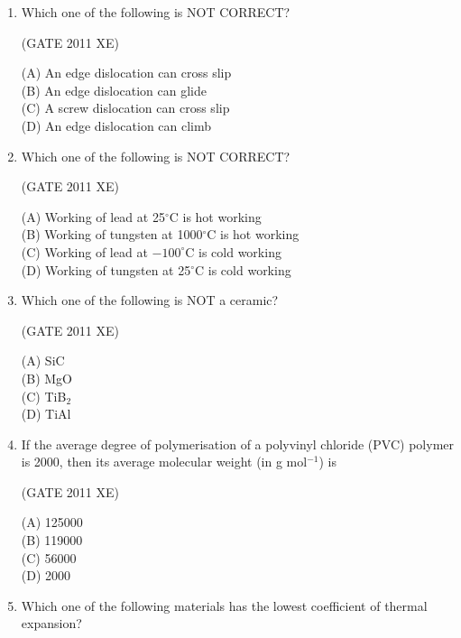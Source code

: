 \documentclass[journal,12pt,onecolumn]{IEEEtran}
\begin{document}
\begin{enumerate}
\begin{enumerate}
\begin{enumerate}
\item Which one of the following is NOT CORRECT?

\hfill{(GATE 2011 XE)}\\
\begin{multicols}{2}
(A) An edge dislocation can cross slip \\
(B) An edge dislocation can glide \\
(C) A screw dislocation can cross slip \\
(D) An edge dislocation can climb
\end{multicols}

\item Which one of the following is NOT CORRECT?

\hfill{(GATE 2011 XE)}\\
\begin{multicols}{2}
(A) Working of lead at 25$^\circ$C is hot working \\
(B) Working of tungsten at 1000$^\circ$C is hot working \\
(C) Working of lead at $-100^\circ$C is cold working \\
(D) Working of tungsten at 25$^\circ$C is cold working
\end{multicols}

\item Which one of the following is NOT a ceramic?

\hfill{(GATE 2011 XE)}\\
\begin{multicols}{4}
(A) SiC \\
(B) MgO \\
(C) TiB$_2$ \\
(D) TiAl
\end{multicols}

\item If the average degree of polymerisation of a polyvinyl chloride (PVC) polymer is 2000, then its average molecular weight (in g mol$^{-1}$) is

\hfill{(GATE 2011 XE)}\\
\begin{multicols}{4}
(A) 125000 \\
(B) 119000 \\
(C) 56000 \\
(D) 2000
\end{multicols}

\item Which one of the following materials has the lowest coefficient of thermal expansion?


\end{enumerate}
\end{enumerate}
\end{enumerate}
\end{document}
